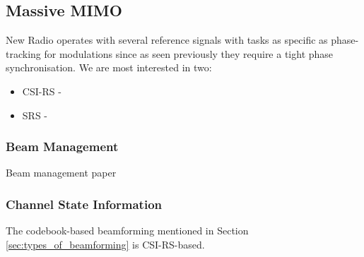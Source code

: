 \subsection*{Massive MIMO}

New Radio operates with several reference signals with tasks as specific as phase-tracking for modulations since as seen previously they require a tight phase synchronisation. We are most interested in two: %

\begin{itemize} %
    \item \ac{CSI-RS} - %
    \item \ac{SRS} - 
\end{itemize}







\subsubsection*{Beam Management} 
Beam management paper \cite{8947954}
\subsubsection*{Channel State Information}
The codebook-based beamforming mentioned in Section \ref{sec:types_of_beamforming} is CSI-RS-based.

